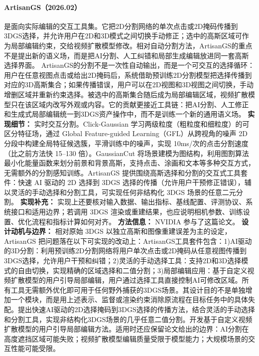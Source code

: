 \paragraph{ArtisanGS（2026.02）\cite{2602_10173}}
是面向实际编辑的交互工具集。它把2D分割网络的单次点击或2D掩码传播到3DGS选择，并允许用户在2D和3D模式之间切换手动修正；选中的高斯区域可作为局部编辑约束，交给视频扩散模型修改。相对自动分割方法，ArtisanGS的重点不是提出新的语义场，而是把AI分割、人工纠错和局部生成编辑放进同一套高斯选择界面。
ArtisanGS的分割不是一次性自动输出，而是一个可交互的选择循环：用户在任意视图点击或给出2D掩码后，系统借助预训练2D分割模型把选择传播到对应的3D高斯集合；如果传播错误，用户可以在2D视图和3D视图之间切换，手动增删区域并重新约束选择。被选中的高斯集合随后成为局部编辑区域，视频扩散模型只在该区域内改写外观或内容。它的贡献更接近工具链：把AI分割、人工修正和生成式局部编辑统一到3DGS资产操作中，而不是训练一个新的通用语义场。
\textbf{实现细节：} 实时交互分割。Click-Gaussian 学习两级粒度（粗粒度和细粒度）的可区分特征场，通过 Global Feature-guided Learning（GFL）从跨视角的噪声 2D 分段中构建全局特征候选簇，平滑训练中的噪声，实现 10ms/次的点击分割速度（比之前方法快 15--130 倍）。GaussianCut 将场景建模为图结构，利用图割算法最小化能量函数来划分前景和背景高斯，支持点击、涂画和文本等多种交互方式，无需额外的分割感知训练。ArtisanGS 提供围绕高斯选择和分割的交互式工具套件：快速 AI 驱动的 2D 选择到 3DGS 选择的传播（允许用户干预修正错误），辅以灵活的手动选择和分割工具，可实现任何非结构化 3DGS 场景的任意二元分割。
\textbf{实现补充：} 实现上还要核对输入数据、输出指标、基线配置、评测协议、系统接口和适用边界；若调用 3DGS 渲染或重建结果，也应说明相机参数、训练设置、优化流程和指标计算如何对齐。
\textbf{方法信息：} NVIDIA 参与了这篇论文。
\textbf{设计动机与边界：} 相对原始 3DGS 以独立高斯和图像重建误差为主的设定，ArtisanGS 把问题落在以下可实现的改动上：ArtisanGS工具套件包含：1)AI驱动的3D分割：利用预训练2D分割网络将用户单次点击或2D掩码从任意视图传播到3DGS选择，允许用户干预和纠错；2)灵活的手动选择工具：支持2D和3D选择模式的自由切换，实现精确的区域选择和二值分割；3)局部编辑应用：基于自定义视频扩散模型的用户引导局部编辑，用户通过选择工具直接控制AI可修改区域。所有工具无需额外优化即可用于任何野外捕获的3DGS场景。其设计目的不是单独增加一个模块，而是用上述表示、监督或渲染约束消除原流程在目标任务中的具体失配。提出快速AI驱动的2D选择掩码到3DGS选择的传播方法，结合灵活的手动选择和分割工具，实现非结构化3DGS场景的几乎任意二值分割。开发基于自定义视频扩散模型的用户引导局部编辑方法。适用时还应保留论文给出的边界：AI分割在高度遮挡区域可能失败；视频扩散模型编辑质量受限于模型能力；大规模场景的交互性能可能受限。
